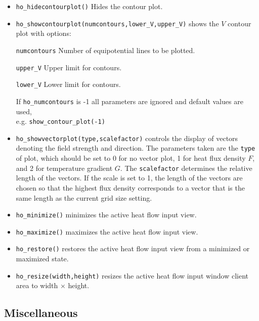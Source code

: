\begin{itemize}
\item \texttt{ho\_hidecontourplot()} Hides the contour plot.

\item \texttt{ho\_showcontourplot(numcontours,lower{\_}V,upper{\_}V)} shows the
$V$ contour plot with options:

\texttt{numcontours} Number of equipotential lines to be plotted.

\texttt{upper{\_}V} Upper limit for contours.

\texttt{lower{\_}V} Lower limit for contours.

If \texttt{ho\_numcontours} is -1 all parameters are ignored and
default values are used, \\ e.g. \texttt{show{\_}contour{\_}plot(-1)}

\item \texttt{ho\_showvectorplot(type,scalefactor)}
controls the display of vectors denoting the field strength and
direction. The parameters taken are the \texttt{type} of plot,
which should be set to 0 for no vector plot, 1 for heat flux density
$F$, and 2 for temperature gradient $G$. The \texttt{scalefactor}
determines the relative length of the vectors. If the scale is set
to 1, the length of the vectors are chosen so that the highest flux
density corresponds to a vector that is the same length as the
current grid size setting.

\item{\tt ho\_minimize()} minimizes the active heat flow input view.

\item{\tt ho\_maximize()} maximizes the active heat flow input view.

\item{\tt ho\_restore()} restores the active heat flow input view from a
 minimized or maximized state.

\item{\tt ho\_resize(width,height)} resizes the active heat flow input
 window client area to width $\times$ height.

\end{itemize}

\subsection{Miscellaneous}

